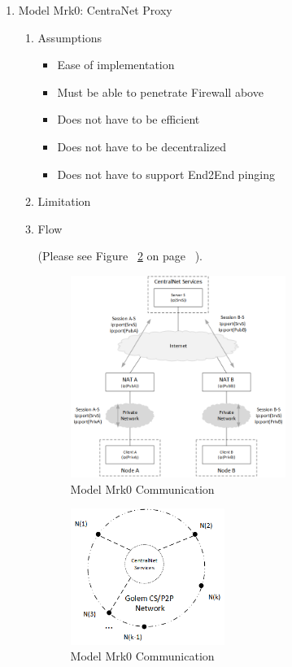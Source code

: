 \begin{enumerate}

\item Model Mrk0: CentraNet Proxy

\begin{enumerate}

\item Assumptions

\begin{itemize}

\item Ease of implementation
\item Must be able to penetrate Firewall above
\item Does not have to be efficient
\item Does not have to be decentralized
\item Does not have to support End2End pinging

\end{itemize}

\item Limitation

\item Flow

(Please see Figure ~\ref{fig:MM0C} on page ~\pageref{fig:MM0C}).

\begin{figure}[H]
    \centering
    \includegraphics[width=7cm,angle=0]{./diag/Issue/Net-Mk0-1-Issue.png}
	\caption{Model Mrk0 Communication}
    \label{fig:MM0C}
\end{figure}

\begin{figure}[H]
    \centering
    \includegraphics[width=5cm,angle=0]{./diag/Issue/Net-Mk0-2-Issue.png}
	\caption{Model Mrk0 Communication}
    \label{fig:MM0C}
\end{figure}




\end{enumerate}
\end{enumerate}

